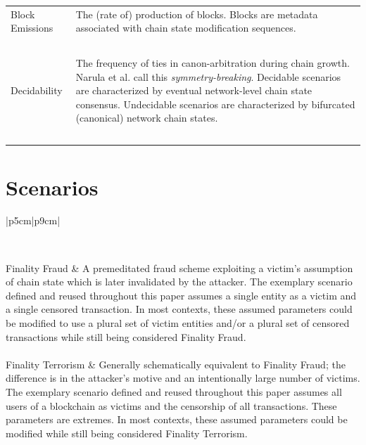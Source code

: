 \documentclass[11pt]{article}
\theoremstyle{plain}
\begin{document}
\begin{table}[H]
{\begin{tabular}{|p{5cm}|p{9cm}|}
Block Emissions &
The (rate of) production of blocks. Blocks are metadata associated with chain state modification sequences.
\\~\\

Decidability &
The frequency of ties in canon-arbitration during chain growth.
Narula et al. call this \emph{symmetry-breaking}.
Decidable scenarios are characterized by eventual network-level chain state consensus.
Undecidable scenarios are characterized by bifurcated (canonical) network chain states.
\\~\\

\hline
\end{tabular}
}
\end{table}


\section{\normalsize{Scenarios}}\label{sec: scenarios}

\begin{table}[H]
\caption{Outlines of Referenced Chain State Scenarios \label{table: chainstate-scenarios}}
\centering
\small{
\begin{tabular}{|p{5cm}|p{9cm}|}

\hline
{} \\
\hline
\hline

Finality Fraud & A premeditated fraud scheme exploiting a victim's
assumption of chain state which is later invalidated by the attacker.
The exemplary scenario defined and reused throughout this paper assumes a single
entity as a victim and a single censored transaction.
In most contexts, these assumed parameters could be modified to use a plural set of victim entities
and/or a plural set of censored transactions while still being considered Finality Fraud.
\\~\\

Finality Terrorism & Generally schematically equivalent to Finality
Fraud; the difference is in the attacker's motive and an intentionally large number of victims.
The exemplary scenario defined and reused throughout this paper
assumes all users of a blockchain as victims and the censorship of all transactions.
These parameters are extremes.
In most contexts, these assumed parameters could be modified while still being considered Finality Terrorism.
\\~\\

\hline
\end{tabular}
}
\end{table}
\end{document}
